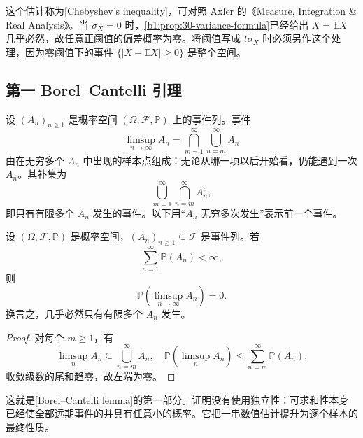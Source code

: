 这个估计称为[Chebyshev's inequality]，可对照 Axler 的《Measure, Integration \& Real Analysis》\cite[Chebyshev's inequality 12.21, p.~389]{Axler2020Measure}。当 \(\sigma_X=0\) 时，\cref{b1:prop:30-variance-formula}已经给出 \(X=\mathbb E X\) 几乎必然，故任意正阈值的偏差概率为零。将阈值写成 \(t\sigma_X\) 时必须另作这个处理，因为零阈值下的事件 \(\{|X-\mathbb E X|\geq0\}\) 是整个空间。

\subsection{第一 Borel–Cantelli 引理}
\label{b1:subsec:300302}

设 \((A_n)_{n\geq1}\) 是概率空间 \((\Omega,\mathcal F,\mathbb P)\) 上的事件列。事件
\[
 \limsup_{n\to\infty}A_n
 =\bigcap_{m=1}^{\infty}\bigcup_{n=m}^{\infty}A_n
\]
由在无穷多个 \(A_n\) 中出现的样本点组成：无论从哪一项以后开始看，仍能遇到一次 \(A_n\)。其补集为
\[
 \bigcup_{m=1}^{\infty}\bigcap_{n=m}^{\infty}A_n^c,
\]
即只有有限多个 \(A_n\) 发生的事件。以下用“\(A_n\) 无穷多次发生”表示前一个事件。

\begin{lemma}\label{b1:lem:30-borel-cantelli-first}
设 \((\Omega,\mathcal F,\mathbb P)\) 是概率空间，\((A_n)_{n\geq1}\subseteq\mathcal F\) 是事件列。若
\[
 \sum_{n=1}^{\infty}\mathbb P(A_n)<\infty,
\]
则
\[
 \mathbb P\left(\limsup_{n\to\infty}A_n\right)=0.
\]
换言之，几乎必然只有有限多个 \(A_n\) 发生。
\end{lemma}
\begin{proof}
对每个 \(m\geq1\)，有
\[
 \limsup_nA_n\subseteq\bigcup_{n=m}^{\infty}A_n,
 \quad
 \mathbb P\left(\limsup_nA_n\right)
 \leq\sum_{n=m}^{\infty}\mathbb P(A_n).
\]
收敛级数的尾和趋零，故左端为零。
\end{proof}

这就是[Borel--Cantelli lemma]的第一部分。证明没有使用独立性：可求和性本身已经使全部远期事件的并具有任意小的概率。它把一串数值估计提升为逐个样本的最终性质。

